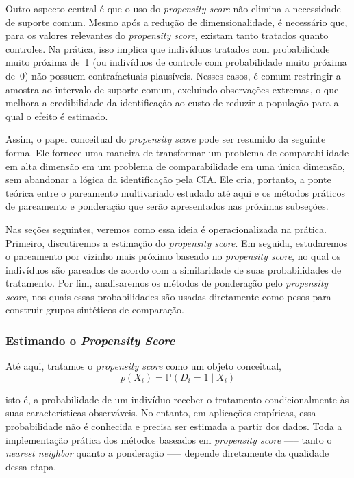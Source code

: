 Outro aspecto central é que o uso do \textit{propensity score} não elimina a necessidade de suporte comum. Mesmo após a redução de dimensionalidade, é necessário que, para os valores relevantes do \textit{propensity score}, existam tanto tratados quanto controles. Na prática, isso implica que indivíduos tratados com probabilidade muito próxima de~1 (ou indivíduos de controle com probabilidade muito próxima de~0) não possuem contrafactuais plausíveis. Nesses casos, é comum restringir a amostra ao intervalo de suporte comum, excluindo observações extremas, o que melhora a credibilidade da identificação ao custo de reduzir a população para a qual o efeito é estimado.


Assim, o papel conceitual do \textit{propensity score} pode ser resumido da seguinte forma. Ele fornece uma maneira de transformar um problema de comparabilidade em alta dimensão em um problema de comparabilidade em uma única dimensão, sem abandonar a lógica da identificação pela CIA. Ele cria, portanto, a ponte teórica entre o pareamento multivariado estudado até aqui e os métodos práticos de pareamento e ponderação que serão apresentados nas próximas subseções.

Nas seções seguintes, veremos como essa ideia é operacionalizada na prática. Primeiro, discutiremos a estimação do \textit{propensity score}. Em seguida, estudaremos o pareamento por vizinho mais próximo baseado no \textit{propensity score}, no qual os indivíduos são pareados de acordo com a similaridade de suas probabilidades de tratamento. Por fim, analisaremos os métodos de ponderação pelo \textit{propensity score}, nos quais essas probabilidades são usadas diretamente como pesos para construir grupos sintéticos de comparação.


\subsubsection{Estimando o \textit{Propensity Score}}

Até aqui, tratamos o p\textit{ropensity score} como um objeto conceitual,
$$
p(X_i) = \mathbb{P}(D_i = 1 \mid X_i)
$$

\noindent isto é, a probabilidade de um indivíduo receber o tratamento condicionalmente às suas características observáveis. No entanto, em aplicações empíricas, essa probabilidade não é conhecida e precisa ser estimada a partir dos dados. Toda a implementação prática dos métodos baseados em \textit{propensity score} —-- tanto o \textit{nearest neighbor} quanto a ponderação —-- depende diretamente da qualidade dessa etapa.

